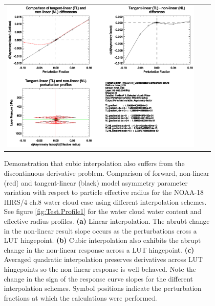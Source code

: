 \begin{figure}[htp]
\begin{tabular}{c c c}
    \includegraphics[bb=90 400 300 540,clip,scale=0.7]{graphics/Cloud/TL/hirs4_n18.ch8.WATER.AVGQUAD.dg_dReff.eps} 
  \end{tabular}
  \caption{Demonstration that cubic interpolation also suffers from the discontinuous derivative problem. Comparison of forward, non-linear (red) and tangent-linear (black) model asymmetry parameter variation with respect to particle effective radius for the NOAA-18 HIRS/4 ch.8 water cloud case using different interpolation schemes. See figure \ref{fig:Test.Profile1} for the water cloud water content and effective radius profiles. \textbf{(a)} Linear interpolation. The abrubt change in the non-linear result slope occurs as the perturbations cross a LUT hingepoint. \textbf{(b)} Cubic interpolation also exhibits the abrupt change in the non-linear response across a LUT hingepoint. \textbf{(c)} Averaged quadratic interpolation preserves derivatives across LUT hingepoints so the non-linear response is well-behaved. Note the change in the sign of the response curve slopes for the different interpolation schemes. Symbol positions indicate the perturbation fractions at which the calculations were performed.}
  \label{fig:hirs4_n18.ch8.WATER.dg_dReff.TL}
\end{figure}

